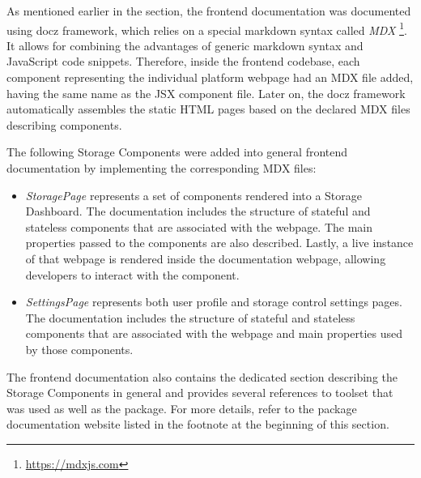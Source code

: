 As mentioned earlier in the section, the frontend documentation was documented using docz framework, which relies on a special markdown syntax called \textit{MDX} \footnote{\url{https://mdxjs.com}}. It allows for combining the advantages of generic markdown syntax and JavaScript code snippets. Therefore, inside the frontend codebase, each component representing the individual platform webpage had an MDX file added, having the same name as the JSX component file. Later on, the docz framework automatically assembles the static HTML pages based on the declared MDX files describing components. 

The following Storage Components were added into general frontend documentation by implementing the corresponding MDX files:
\begin{itemize}
    \item \textit{StoragePage} represents a set of components rendered into a Storage Dashboard. The documentation includes the structure of stateful and stateless components that are associated with the webpage. The main properties passed to the components are also described. Lastly, a live instance of that webpage is rendered inside the documentation webpage, allowing developers to interact with the component.
    \item \textit{SettingsPage} represents both user profile and storage control settings pages. The documentation includes the structure of stateful and stateless components that are associated with the webpage and main properties used by those components. 
\end{itemize}

The frontend documentation also contains the dedicated section describing the Storage Components in general and provides several references to \solid{} toolset that was used as well as the \lpas{} package. For more details, refer to the package documentation website listed in the footnote at the beginning of this section.
